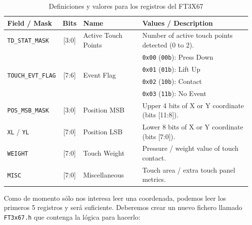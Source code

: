 \documentclass[../main.tex]{subfiles}
\begin{document}
            \begin{table}[h!]
                \centering
                \small
                \renewcommand{\arraystretch}{1.25}
                \begin{tabularx}{\textwidth}{l c l X}
                    \toprule
                    \textbf{Field / Mask} & \textbf{Bits} & \textbf{Name} & \textbf{Values / Description} \\
                    \midrule
                    \texttt{TD\_STAT\_MASK} & [3:0] & Active Touch Points & Number of active touch points detected (0 to 2). \\
                    \midrule
                    \multirow{4}{*}{\texttt{TOUCH\_EVT\_FLAG}} & \multirow{4}{*}{[7:6]} & \multirow{4}{*}{Event Flag} & \texttt{0x00} (\texttt{00b}): Press Down \\
                    & & & \texttt{0x01} (\texttt{01b}): Lift Up \\
                    & & & \texttt{0x02} (\texttt{10b}): Contact \\
                    & & & \texttt{0x03} (\texttt{11b}): No Event \\
                    \midrule
                    \texttt{POS\_MSB\_MASK} & [3:0] & Position MSB & Upper 4 bits of X or Y coordinate (bits [11:8]). \\
                    \midrule
                    \texttt{XL} / \texttt{YL} & [7:0] & Position LSB & Lower 8 bits of X or Y coordinate (bits [7:0]). \\
                    \midrule
                    \texttt{WEIGHT} & [7:0] & Touch Weight & Pressure / weight value of touch contact. \\
                    \midrule
                    \texttt{MISC} & [7:0] & Miscellaneous & Touch area / extra touch panel metrics. \\
                    \bottomrule
                \end{tabularx}
                \caption{Definiciones y valores para los registros del FT3X67}
                \label{fig:ft3x67_definitions}
            \end{table}
       
            Como de momento sólo nos interesa leer una coordenada, podemos leer los primeros 5 registros y será suficiente. Deberemos crear un nuevo fichero llamado \texttt{FT3x67.h} que contenga la lógica para hacerlo:
\end{document}
